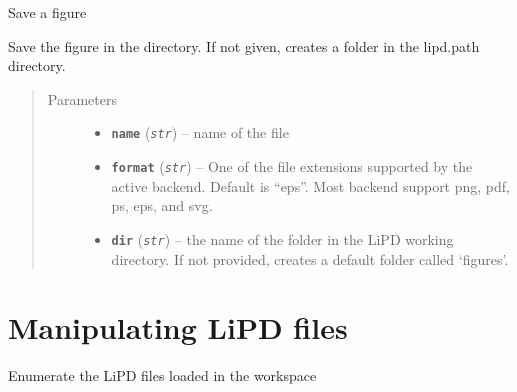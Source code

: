\documentclass[letterpaper,10pt,english]{sphinxmanual}
\begin{document}

\begin{fulllineitems}
\label{LIPDutils:pyleoclim.saveFigure}
Save a figure

Save the figure in the directory. If not given, creates a folder in the
lipd.path directory.
\begin{quote}\begin{description}
\item[{Parameters}] \leavevmode\begin{itemize}
\item {} 
\textbf{\texttt{name}} (\emph{\texttt{str}}) -- name of the file

\item {} 
\textbf{\texttt{format}} (\emph{\texttt{str}}) -- One of the file extensions supported by the active
backend. Default is ``eps''. Most backend support png, pdf, ps, eps,
and svg.

\item {} 
\textbf{\texttt{dir}} (\emph{\texttt{str}}) -- the name of the folder in the LiPD working directory.
If not provided, creates a default folder called `figures'.

\end{itemize}

\end{description}\end{quote}

\end{fulllineitems}



\section{Manipulating LiPD files}
\label{LIPDutils:id1}

\begin{fulllineitems}
\label{LIPDutils:pyleoclim.enumerateLipds}
Enumerate the LiPD files loaded in the workspace

\end{fulllineitems}

\end{document}
